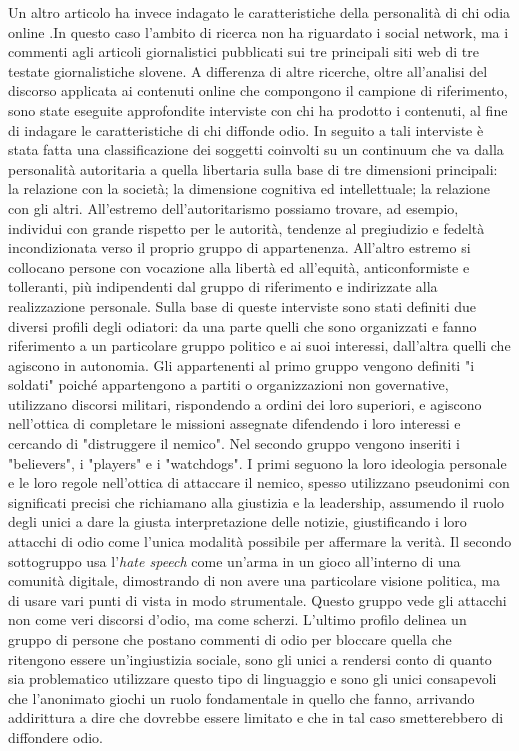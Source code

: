 Un altro articolo ha invece indagato le caratteristiche della personalità di chi odia online \citep{erjavec2012}.In questo caso l'ambito di ricerca non ha riguardato i social network, ma i commenti agli articoli giornalistici pubblicati sui tre principali siti web di tre testate giornalistiche slovene. A differenza di altre ricerche, oltre all'analisi del discorso applicata ai contenuti online che compongono il campione di riferimento, sono state  eseguite approfondite interviste con chi ha prodotto i contenuti, al fine di indagare le caratteristiche di chi diffonde odio. In seguito a tali interviste è stata fatta una classificazione dei soggetti coinvolti su un continuum che va dalla personalità autoritaria  a quella libertaria sulla base di tre dimensioni principali: la relazione con la società; la dimensione cognitiva ed intellettuale; la relazione con gli altri. All'estremo dell’autoritarismo possiamo trovare, ad esempio, individui con grande rispetto per le autorità, tendenze al pregiudizio e fedeltà incondizionata verso il proprio gruppo di appartenenza. All'altro estremo si collocano persone con vocazione alla libertà ed all'equità, anticonformiste e tolleranti, più indipendenti dal gruppo di riferimento e indirizzate alla realizzazione personale.
Sulla base di queste interviste sono stati definiti due diversi  profili degli odiatori: da una parte quelli che sono organizzati e fanno riferimento a un particolare gruppo politico e ai suoi interessi, dall'altra quelli che agiscono in autonomia. Gli appartenenti al primo gruppo vengono definiti "i soldati" poiché appartengono a partiti o organizzazioni non governative, utilizzano discorsi militari, rispondendo a ordini dei loro superiori, e agiscono nell'ottica di completare le missioni assegnate difendendo i loro interessi e cercando di "distruggere il nemico". Nel secondo gruppo vengono inseriti i "believers", i "players" e i "watchdogs". I primi seguono la loro ideologia personale e le loro regole nell'ottica di attaccare il nemico, spesso utilizzano pseudonimi con significati precisi che richiamano alla giustizia e la leadership, assumendo il ruolo degli unici a dare la giusta interpretazione delle notizie, giustificando i loro attacchi di odio come l'unica modalità possibile per affermare la verità. Il secondo sottogruppo usa l'\textit{hate speech} come un'arma in un gioco all'interno di una comunità digitale, dimostrando di non avere una particolare visione politica, ma di usare vari punti di vista in modo strumentale. Questo gruppo vede gli attacchi non come veri discorsi d'odio, ma come scherzi. L'ultimo profilo delinea un gruppo di persone che postano commenti di odio per bloccare quella che ritengono essere un'ingiustizia sociale, sono gli unici a rendersi conto di quanto sia problematico utilizzare questo tipo di linguaggio e sono gli unici consapevoli che l'anonimato giochi un ruolo fondamentale in quello che fanno, arrivando addirittura a dire che dovrebbe essere limitato e che in tal caso smetterebbero di diffondere odio.

